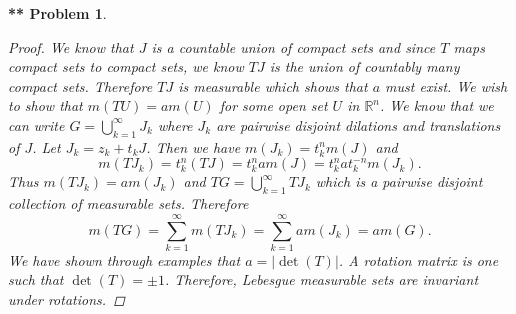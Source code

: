 \documentclass{article}
\newtheorem{**}{** Problem}
\begin{document}
\begin{flushleft}
\begin{**}
\begin{proof}
We know that $J$ is a countable union of compact sets and since $T$ maps compact sets to compact sets, we know $TJ$ is the union of countably many compact sets. Therefore $TJ$ is measurable which shows that $a$ must exist. We wish to show that $m(TU) = am(U)$ for some open set $U$ in $\mathbb{R}^n$. We know that we can write $G = \bigcup_{k=1}^{\infty} J_k$ where $J_k$ are pairwise disjoint dilations and translations of $J$. Let $J_k = z_k + t_kJ$. Then we have $m(J_k) = t_k^nm(J)$ and
\[
m(TJ_k) = t_k^n(TJ) = t_k^nam(J) = t_k^nat_k^{-n}m(J_k).
\]
Thus $m(TJ_k) = am(J_k)$ and $TG = \bigcup_{k=1}^{\infty} TJ_k$ which is a pairwise disjoint collection of measurable sets. Therefore
\[
m(TG) = \sum_{k=1}^{\infty} m(TJ_k) = \sum_{k=1}^{\infty} am(J_k) = am(G).
\]
We have shown through examples that $a = |\det (T)|$. A rotation matrix is one such that $\det (T) = \pm 1$. Therefore, Lebesgue measurable sets are invariant under rotations.
\end{proof}
\end{**}

\end{flushleft}
\end{document}
